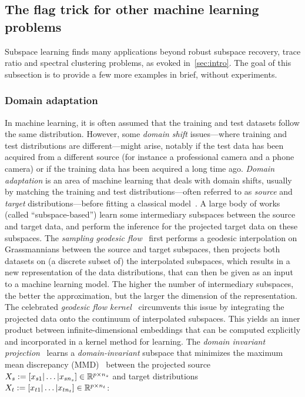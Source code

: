\subsection{The flag trick for other machine learning problems}
Subspace learning finds many applications beyond robust subspace recovery, trace ratio and spectral clustering problems, as evoked in~\autoref{sec:intro}. The goal of this subsection is to provide a few more examples in brief, without experiments.


\subsubsection{Domain adaptation}
In machine learning, it is often assumed that the training and test datasets follow the same distribution. However, some \textit{domain shift} issues---where training and test distributions are different---might arise, notably if the test data has been acquired from a different source (for instance a professional camera and a phone camera) or if the training data has been acquired a long time ago. \textit{Domain adaptation} is an area of machine learning that deals with domain shifts, usually by matching the training and test distributions---often referred to as \textit{source} and \textit{target} distributions---before fitting a classical model~\citep{farahani_brief_2021}. 
A large body of works (called ``subspace-based'') learn some intermediary subspaces between the source and target data, and perform the inference for the projected target data on these subspaces. The \textit{sampling geodesic flow}~\citep{gopalan_domain_2011} first performs a geodesic interpolation on Grassmannians between the source and target subspaces, then projects both datasets on (a discrete subset of) the interpolated subspaces, which results in a new representation of the data distributions, that can then be given as an input to a machine learning model. The higher the number of intermediary subspaces, the better the approximation, but the larger the dimension of the representation.
The celebrated \textit{geodesic flow kernel}~\citep{boqing_gong_geodesic_2012} circumvents this issue by integrating the projected data onto the continuum of interpolated subspaces. This yields an inner product between infinite-dimensional embeddings that can be computed explicitly and incorporated in a kernel method for learning. The \textit{domain invariant projection}~\citep{baktashmotlagh_unsupervised_2013} learns a \textit{domain-invariant} subspace that minimizes the maximum mean discrepancy (MMD)~\citep{gretton_kernel_2012} between the projected source $X_s := [x_{s1}|\dots|x_{s n_s}] \in \mathbb{R}^{p\times n_s}$ and target distributions $X_t := [x_{t1}|\dots|x_{t n_t}] \in \mathbb{R}^{p\times n_t}$:
